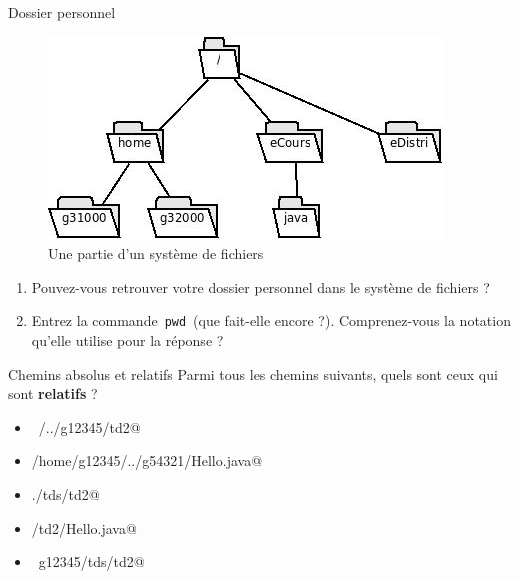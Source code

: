 \documentclass[a4paper,11pt]{article}
\begin{document}
\begin{Exercice}{Dossier personnel}
	

\begin{figure}[hbt]
	\begin{center}
		\includegraphics[width=0.8\linewidth,height=0.8\textheight,keepaspectratio=true]{image/fs.jpeg}
	\end{center}
	
	\caption[Une partie d'un syst\`eme de fichiers]{Une partie d'un syst\`eme de fichiers}
\end{figure}

\begin{enumerate}
	
	\item 
	Pouvez-vous retrouver votre dossier personnel dans le syst\`eme de fichiers ?  
	
	\item 
	Entrez la commande \,\verb|pwd|\, (que fait-elle encore ?). 
	Comprenez-vous la notation qu'elle utilise pour la r\'eponse ?
	
\end{enumerate}

\end{Exercice}

\begin{Exercice}{Chemins absolus et relatifs}
	Parmi tous les chemins suivants, quels sont ceux qui sont 
	\textbf{relatifs} ?
	
	\begin{itemize} 
		
		\item[ \ding{"6F} ]  \verb@~/../g12345/td2@
		
		\item[ \ding{"6F} ]  \verb@/home/g12345/../g54321/Hello.java@
		
		\item[ \ding{"6F} ]  \verb@./tds/td2@
		
		\item[ \ding{"6F} ]  \verb@tds/td2/Hello.java@
		
		\item[ \ding{"6F} ]  \verb@~g12345/tds/td2@
		
	\end{itemize} 
\end{Exercice}
\end{document}

